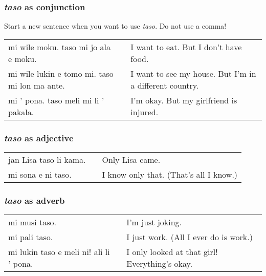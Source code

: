 {\subsubsection*{\textit{taso} as conjunction}
%
Start a new sentence when you want to use \textit{taso}.
Do not use a comma!

\begin{supertabular}{p{5,5cm}|ll}
mi wile moku. taso mi jo ala e moku. && I want to eat. But I don't have food. \\ 
mi wile lukin e tomo mi. taso mi lon ma ante. && I want to see my house. But I'm in a different country. \\ 
mi ' pona. taso meli mi li ' pakala. && I'm okay. But my girlfriend is injured. \\
\end{supertabular} 
%
\subsubsection*{\textit{taso} as adjective}
%
\begin{supertabular}{p{5,5cm}|ll}
jan Lisa taso li kama. && Only Lisa came. \\
mi sona e ni taso. && I know only that. (That's all I know.) \\
\end{supertabular} 
%
\subsubsection*{\textit{taso} as adverb}
%
\begin{supertabular}{p{5,5cm}|ll}
mi musi taso. && I'm just joking. \\
mi pali taso. && I just work. (All I ever do is work.) \\ 
mi lukin taso e meli ni! ali li ' pona. && I only looked at that girl! Everything's okay. \\
\end{supertabular} 
%
}
